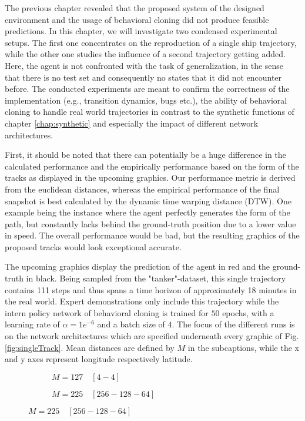 The previous chapter revealed that the proposed system of the designed environment and the usage of behavioral cloning did not produce feasible predictions. In this chapter, we will investigate two condensed experimental setups. The first one concentrates on the reproduction of a single ship trajectory, while the other one studies the influence of a second trajectory getting added. Here, the agent is not confronted with the task of generalization, in the sense that there is no test set and consequently no states that it did not encounter before. The conducted experiments are meant to confirm the correctness of the implementation (e.g., transition dynamics, bugs etc.), the ability of behavioral cloning to handle real world trajectories in contrast to the synthetic functions of chapter \ref{chap:synthetic} and especially the impact of different network architectures.
\par
First, it should be noted that there can potentially be a huge difference in the calculated performance and the empirically performance based on the form of the tracks as displayed in the upcoming graphics. Our performance metric is derived from the euclidean distances, whereas the empirical performance of the final snapshot is best calculated by the dynamic time warping distance (DTW). One example being the instance where the agent perfectly generates the form of the path, but constantly lacks behind the ground-truth position due to a lower value in speed. The overall performance would be bad, but the resulting graphics of the proposed tracks would look exceptional accurate.
\par
The upcoming graphics display the prediction of the agent in red and the ground-truth in black. Being sampled from the "tanker"-dataset, this single trajectory contains 111 steps and thus spans a time horizon of approximately 18 minutes in the real world. Expert demonstrations only include this trajectory while the intern policy network of behavioral cloning is trained for $50$ epochs, with a learning rate of $\alpha = 1e^{-6}$ and a batch size of $4$. The focus of the different runs is on the network architectures which are specified underneath every graphic of Fig. \ref{fig:singleTrack}. Mean distances are defined by $M$ in the subcaptions, while the x and y axes represent longitude respectively latitude.
\begin{figure}[H]
     \centering
     \begin{subfigure}[b]{0.48\textwidth}
         \centering
       
         \caption{$M=127 \quad [4-4]$}
         \label{fig:single1}
     \end{subfigure}
     \hfill
     \begin{subfigure}[b]{0.48\textwidth}
         \centering
             
         \caption{$M=225 \quad [256-128-64]$}
         \label{fig:single2}
     \end{subfigure}
\end{figure}
